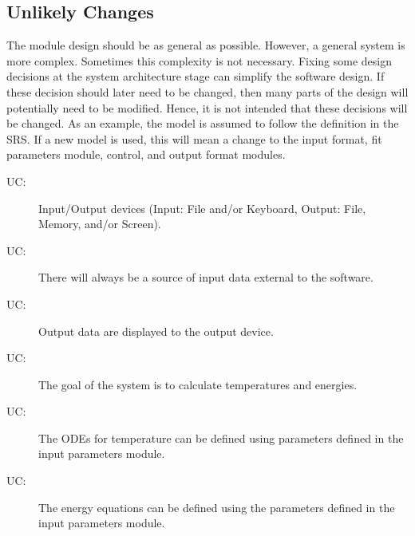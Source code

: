 \documentclass[12pt]{article}
\newcounter{ucnum}
\newcommand{\uctheucnum}{UC\theucnum}
\begin{document}
\subsection{Unlikely Changes}
\label{Sec:UnliChan}
The module design should be as general as possible. However, a general system is more complex. Sometimes this complexity is not necessary. Fixing some design decisions at the system architecture stage can simplify the software design. If these decision should later need to be changed, then many parts of the design will potentially need to be modified. Hence, it is not intended that these decisions will be changed.  As an example, the model is assumed to follow the definition in the SRS.  If a new model is used, this will mean a change to the input format, fit parameters module, control, and output format modules.
\begin{description}
\item[\uctheucnum\label{UC:IO}:]Input/Output devices (Input: File and/or Keyboard, Output: File, Memory, and/or Screen).
\end{description}
\begin{description}
\item[\uctheucnum\label{UC:inputsource}:]There will always be a source of input data external to the software.
\end{description}
\begin{description}
\item[\uctheucnum\label{UC:output}:]Output data are displayed to the output device.
\end{description}
\begin{description}
\item[\uctheucnum\label{UC:goal}:]The goal of the system is to calculate temperatures and energies.
\end{description}
\begin{description}
\item[\uctheucnum\label{UC:odes}:]The ODEs for temperature can be defined using parameters defined in the input parameters module.
\end{description}
\begin{description}
\item[\uctheucnum\label{UC:energy}:]The energy equations can be defined using the parameters defined in the input parameters module.
\end{description}
\end{document}
